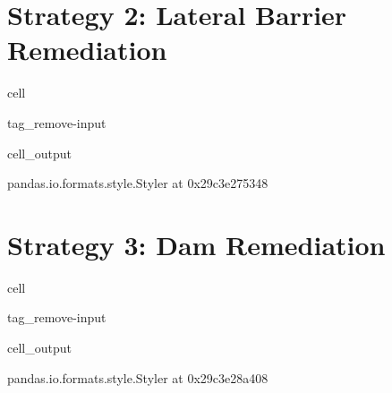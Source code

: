 \documentclass[letterpaper,10pt,english]{jupyterBook}
\begin{document}
\section{Strategy 2: Lateral Barrier Remediation}
\label{\detokenize{EcoAttributes:strategy-2-lateral-barrier-remediation}}
\begin{sphinxuseclass}{cell}
\begin{sphinxuseclass}{tag_remove-input}\begin{sphinxVerbatimOutput}

\begin{sphinxuseclass}{cell_output}
\begin{sphinxVerbatim}[commandchars=\\\{\}]
\PYGZlt{}pandas.io.formats.style.Styler at 0x29c3e275348\PYGZgt{}
\end{sphinxVerbatim}

\end{sphinxuseclass}\end{sphinxVerbatimOutput}

\end{sphinxuseclass}
\end{sphinxuseclass}

\section{Strategy 3: Dam Remediation}
\label{\detokenize{EcoAttributes:strategy-3-dam-remediation}}
\begin{sphinxuseclass}{cell}
\begin{sphinxuseclass}{tag_remove-input}\begin{sphinxVerbatimOutput}

\begin{sphinxuseclass}{cell_output}
\begin{sphinxVerbatim}[commandchars=\\\{\}]
\PYGZlt{}pandas.io.formats.style.Styler at 0x29c3e28a408\PYGZgt{}
\end{sphinxVerbatim}

\end{sphinxuseclass}\end{sphinxVerbatimOutput}

\end{sphinxuseclass}
\end{sphinxuseclass}
\end{document}
